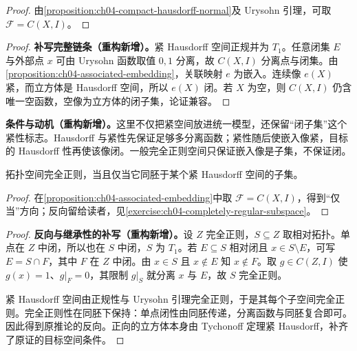 \documentclass[../../main.tex]{subfiles}
\begin{document}
\begin{proof}
由\cref{proposition:ch04-compact-hausdorff-normal}及 Urysohn 引理，可取 $\mathcal F=C(X,I)$。
\end{proof}
\begin{proof}
\textbf{补写完整链条（重构新增）。}紧 Hausdorff 空间正规并为 $T_1$。任意闭集 $E$ 与外部点 $x$ 可由 Urysohn 函数取值 $0,1$ 分离，故 $C(X,I)$ 分离点与闭集。由\cref{proposition:ch04-associated-embedding}，关联映射 $e$ 为嵌入。连续像 $e(X)$ 紧，而立方体是 Hausdorff 空间，所以 $e(X)$ 闭。若 $X$ 为空，则 $C(X,I)$ 仍含唯一空函数，空像为立方体的闭子集，论证兼容。
\end{proof}
\begin{remark}
\textbf{条件与动机（重构新增）。}这里不仅把紧空间放进统一模型，还保留“闭子集”这个紧性标志。Hausdorff 与紧性先保证足够多分离函数；紧性随后使嵌入像紧，目标的 Hausdorff 性再使该像闭。一般完全正则空间只保证嵌入像是子集，不保证闭。
\end{remark}
\begin{corollary}\label{corollary:ch04-completely-regular-compact-subspace}
拓扑空间完全正则，当且仅当它同胚于某个紧 Hausdorff 空间的子集。
\end{corollary}
\begin{proof}
在\cref{proposition:ch04-associated-embedding}中取 $\mathcal F=C(X,I)$，得到“仅当”方向；反向留给读者，见\cref{exercise:ch04-completely-regular-subspace}。
\end{proof}
\begin{proof}
\textbf{反向与继承性的补写（重构新增）。}设 $Z$ 完全正则，$S\subseteq Z$ 取相对拓扑。单点在 $Z$ 中闭，所以也在 $S$ 中闭，$S$ 为 $T_1$。若 $E\subseteq S$ 相对闭且 $x\in S\setminus E$，可写 $E=S\cap F$，其中 $F$ 在 $Z$ 中闭。由 $x\in S$ 且 $x\notin E$ 知 $x\notin F$。取 $g\in C(Z,I)$ 使 $g(x)=1$、$g|_F=0$，其限制 $g|_S$ 就分离 $x$ 与 $E$，故 $S$ 完全正则。

紧 Hausdorff 空间由正规性与 Urysohn 引理完全正则，于是其每个子空间完全正则。完全正则性在同胚下保持：单点闭性由同胚传递，分离函数与同胚复合即可。因此得到原推论的反向。正向的立方体本身由 Tychonoff 定理紧 Hausdorff，补齐了原证的目标空间条件。
\end{proof}
\end{document}
